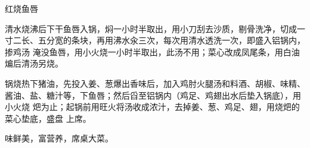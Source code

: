 \begin{recipe}{红烧鱼唇}

\ingredients


\preparation

\step 清水烧沸后下干鱼唇入锅，焖一小时半取出，用小刀刮去沙质，剔骨洗净，切成一
寸二长、五分宽的条块，再用沸水汆三次，每次用清水透洗一次，即盛入铝锅内，掺鸡汤
淹没鱼唇，用小火烧一小时半取出，此汤不用；菜心改成凤尾条，用白油煸后清汤另烧。

\step 锅烧热下猪油，先投入姜、葱爆出香味后，加入鸡肘火腿汤和料酒、胡椒、味精、
酱油、盐、糖汁等，下鱼唇；然后舀至铝锅内（鸡足、鸡翅出水后垫入锅底），用小火烧
𤆵为止；起锅前用旺火将汤收成浓汁，去掉姜、葱、鸡足、翅，用烧𤆵的菜心垫底，盛盘
上席。

\features

味鲜美，富营养，席桌大菜。

\end{recipe}

